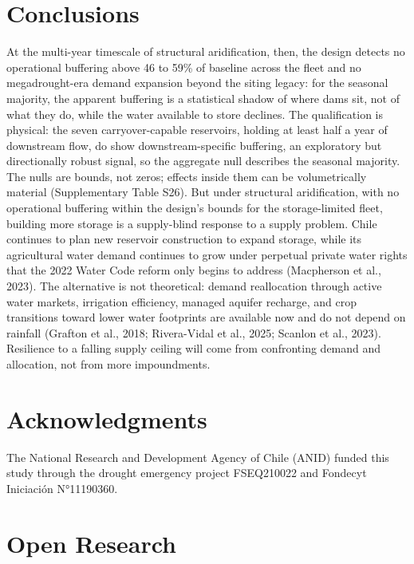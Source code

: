 \documentclass[
]{agujournal2019}
\begin{document}
\section{Conclusions}\label{conclusions}

At the multi-year timescale of structural aridification, then, the
design detects no operational buffering above 46 to 59\% of baseline
across the fleet and no megadrought-era demand expansion beyond the
siting legacy: for the seasonal majority, the apparent buffering is a
statistical shadow of where dams sit, not of what they do, while the
water available to store declines. The qualification is physical: the
seven carryover-capable reservoirs, holding at least half a year of
downstream flow, do show downstream-specific buffering, an exploratory
but directionally robust signal, so the aggregate null describes the
seasonal majority. The nulls are bounds, not zeros; effects inside them
can be volumetrically material (Supplementary Table S26). But under
structural aridification, with no operational buffering within the
design's bounds for the storage-limited fleet, building more storage is
a supply-blind response to a supply problem. Chile continues to plan new
reservoir construction to expand storage, while its agricultural water
demand continues to grow under perpetual private water rights that the
2022 Water Code reform only begins to address (Macpherson et al., 2023).
The alternative is not theoretical: demand reallocation through active
water markets, irrigation efficiency, managed aquifer recharge, and crop
transitions toward lower water footprints are available now and do not
depend on rainfall (Grafton et al., 2018; Rivera-Vidal et al., 2025;
Scanlon et al., 2023). Resilience to a falling supply ceiling will come
from confronting demand and allocation, not from more impoundments.

\section*{Acknowledgments}\label{acknowledgments}

The National Research and Development Agency of Chile (ANID) funded this
study through the drought emergency project FSEQ210022 and Fondecyt
Iniciación N°11190360.

\section*{Open Research}\label{open-research}
\end{document}
